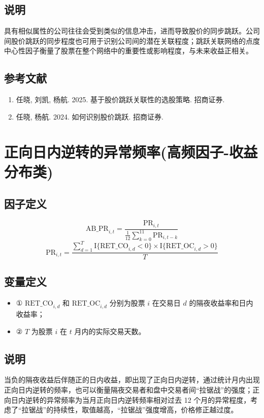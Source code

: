 \documentclass{article}
\begin{document}
\subsection{说明}
具有相似属性的公司往往会受到类似的信息冲击，进而导致股价的同步跳跃。公司间股价跳跃的同步程度也可用于识别公司间的潜在关联程度；跳跃关联网络的点度中心性因子衡量了股票在整个网络中的重要性或影响程度，与未来收益正相关。

\subsection{参考文献}
\begin{enumerate}
    \item 任晓, 刘凯, 杨航. 2025. 基于股价跳跃关联性的选股策略. 招商证券.
    \item 任晓, 杨航. 2024. 如何识别股价跳跃. 招商证券.
\end{enumerate}

\section{正向日内逆转的异常频率(高频因子-收益分布类)}

\subsection{因子定义}

\begin{equation}
    \mathrm{AB\_PR}_{i,t} = \frac{\mathrm{PR}_{i,t}}{\frac{1}{12} \sum_{k=0}^{11} \mathrm{PR}_{i,t-k}}
\end{equation}
\begin{equation}
    \mathrm{PR}_{i,t} = \frac{\sum_{d=1}^{T} \mathrm{I}\{\mathrm{RET\_CO}_{i,d}<0\} \times \mathrm{I}\{\mathrm{RET\_OC}_{i,d}>0\}}{T}
\end{equation}

\subsection{变量定义}
\begin{itemize}
    \item ① \( \mathrm{RET\_CO}_{i,d} \) 和 \( \mathrm{RET\_OC}_{i,d} \) 分别为股票 \( i \) 在交易日 \( d \) 的隔夜收益率和日内收益率；
    \item ② \( T \) 为股票 \( i \) 在 \( t \) 月内的实际交易天数。
\end{itemize}

\subsection{说明}
当负的隔夜收益后伴随正的日内收益，即出现了正向日内逆转，通过统计月内出现正向日内逆转的频率，也可以衡量隔夜交易者和盘中交易者间“拉锯战”的强度；正向日内逆转的异常频率为当月正向日内逆转频率相对过去 12 个月的异常程度，考虑了“拉锯战”的持续性，取值越高，“拉锯战”强度增高，价格修正越过度。
\end{document}
